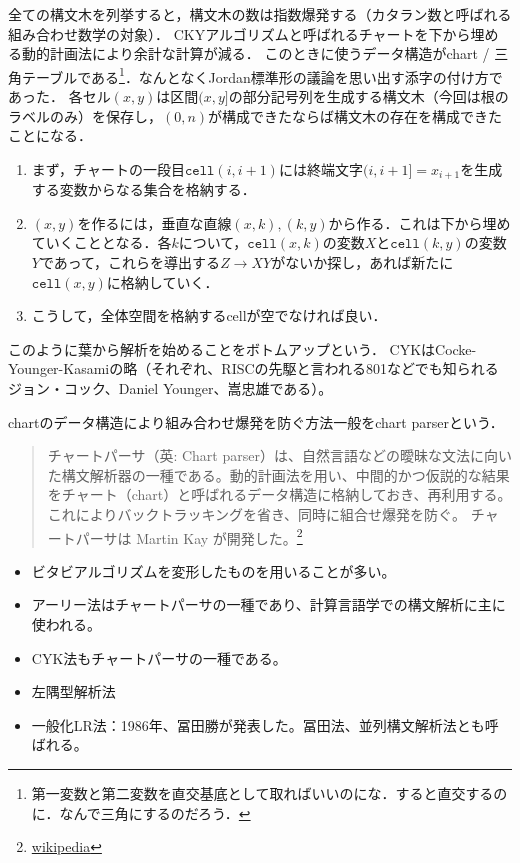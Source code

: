 \begin{discussion}
    全ての構文木を列挙すると，構文木の数は指数爆発する（カタラン数と呼ばれる組み合わせ数学の対象）．
    CKYアルゴリズムと呼ばれるチャートを下から埋める動的計画法により余計な計算が減る．
    このときに使うデータ構造がchart / 三角テーブルである\footnote{第一変数と第二変数を直交基底として取ればいいのにな．すると直交するのに．なんで三角にするのだろう．}．なんとなくJordan標準形の議論を思い出す添字の付け方であった．
    各セル$(x,y)$は区間$(x,y]$の部分記号列を生成する構文木（今回は根のラベルのみ）を保存し，$(0,n)$が構成できたならば構文木の存在を構成できたことになる．
    \begin{enumerate}
        \item まず，チャートの一段目$\mathtt{cell}(i,i+1)$には終端文字$(i,i+1]=x_{i+1}$を生成する変数からなる集合を格納する．
        \item $(x,y)$を作るには，垂直な直線$(x,k),(k,y)$から作る．これは下から埋めていくこととなる．各$k$について，$\mathtt{cell}(x,k)$の変数$X$と$\mathtt{cell}(k,y)$の変数$Y$であって，これらを導出する$Z\to XY$がないか探し，あれば新たに$\mathtt{cell}(x,y)$に格納していく．
        \item こうして，全体空間を格納するcellが空でなければ良い．
    \end{enumerate}
    このように葉から解析を始めることをボトムアップという．
    CYKはCocke-Younger-Kasamiの略（それぞれ、RISCの先駆と言われる801などでも知られるジョン・コック、Daniel Younger、嵩忠雄である）。
\end{discussion}
\begin{remark}
    chartのデータ構造により組み合わせ爆発を防ぐ方法一般をchart parserという．
    \begin{quote}
        チャートパーサ（英: Chart parser）は、自然言語などの曖昧な文法に向いた構文解析器の一種である。動的計画法を用い、中間的かつ仮説的な結果をチャート（chart）と呼ばれるデータ構造に格納しておき、再利用する。これによりバックトラッキングを省き、同時に組合せ爆発を防ぐ。
        チャートパーサは Martin Kay が開発した。\footnote{\href{https://ja.wikipedia.org/wiki/チャートパーサ}{wikipedia}}
    \end{quote}
    \begin{itemize}
        \item ビタビアルゴリズムを変形したものを用いることが多い。
        \item アーリー法はチャートパーサの一種であり、計算言語学での構文解析に主に使われる。
        \item CYK法もチャートパーサの一種である。
        \item 左隅型解析法
        \item 一般化LR法：1986年、冨田勝が発表した。冨田法、並列構文解析法とも呼ばれる。
    \end{itemize}
\end{remark}
